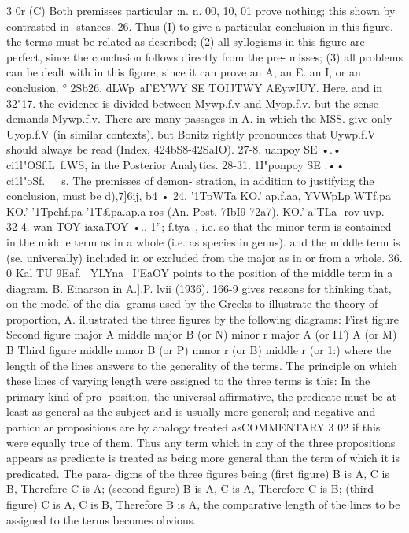 {{{{3 0r
(C) Both premisses particular
:n.
n. 00, 10, 01 prove nothing; this shown by contrasted in-
stances.
26. Thus (I) to give a particular conclusion in this figure. the
terms must be related as described; (2) all syllogisms in this figure
are perfect, since the conclusion follows directly from the pre-
misses; (3) all problems can be dealt with in this figure, since it
can prove an A, an E. an I, or an conclusion.
°
2Sb26. dLWp~aI'EYWY SE TOIJTWY AEywIUY.
Here. and in 32"17.
the evidence is divided between Mywp.f.v and Myop.f.v. but
the sense demands Mywp.f.v. There are many passages in A. in
which the MSS. give only Uyop.f.V (in similar contexts). but
Bonitz rightly pronounces that Uywp.f.V should always be read
(Index, 424bS8-42SaIO).
27-8. uanpoy SE •.• ci1l"OSf.L~f.WS, in the Posterior Analytics.
28-31. 1I"ponpoy SE .•• ci1l"oSf.~~~s. The premisses of demon-
stration, in addition to justifying the conclusion, must be d),7]6ij,
b4 • 24,
'1TpWTa KO.' ap.f.aa, YVWpLp.WTf.pa KO.' '1Tpchf.pa
'1T£pa.ap.a-ros (An. Post. 7IbI9-72a7).
KO.'
a'TLa -rov uvp.-
32-4. wan TOY iaxaTOY •.. 1''; f.tya~, i.e. so that the minor
term is contained in the middle term as in a whole (i.e. as species
in genus). and the middle term is (se. universally) included in or
excluded from the major as in or from a whole.
36. 0 Kal TU 9Eaf.~ YLYna~ I'EaOY points to the position of the
middle term in a diagram. B. Einarson in A.].P. lvii (1936).
166-9 gives reasons for thinking that, on the model of the dia-
grams used by the Greeks to illustrate the theory of proportion,
A. illustrated the three figures by the following diagrams:
First figure
Second figure
major
A
middle
major
B (or N)
minor
r
major
A (or IT)
A (or M)
B
Third figure
middle
mmor
B (or P)
mmor
r
(or B)
middle
r
(or 1:)
where the length of the lines answers to the generality of the
terms. The principle on which these lines of varying length were
assigned to the three terms is this: In the primary kind of pro-
position, the universal affirmative, the predicate must be at least
as general as the subject and is usually more general; and
negative and particular propositions are by analogy treated asCOMMENTARY
3 02
if this were equally true of them. Thus any term which in any
of the three propositions appears as predicate is treated as being
more general than the term of which it is predicated. The para-
digms of the three figures being (first figure) B is A, C is B,
Therefore C is A; (second figure) B is A, C is A, Therefore C is B;
(third figure) C is A, C is B, Therefore B is A, the comparative
length of the lines to be assigned to the terms becomes obvious.
}}}}
